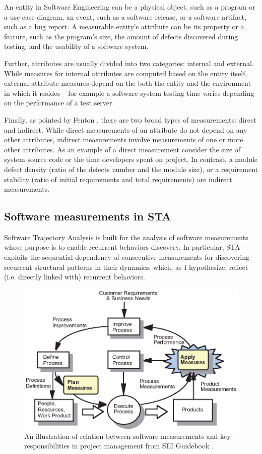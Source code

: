 An entity in Software Engineering can be a physical object, such as a program or a use case diagram, 
an event, such as a software release, or a software artifact, such as a bug report.
A measurable entity's attribute can be its property or a feature, such as the program's size, the 
amount of defects discovered during testing, and the usability of a software system.

Further, attributes are usually divided into two categories: internal and external. 
While measures for internal attributes are computed based on the entity itself, external attribute 
measures depend on the both the entity and the environment in which it resides -- for example a 
software system testing time varies depending on the performance of a test server.

Finally, as pointed by Fenton \cite{citeulike:1803429}, there are two broad types of measurements: direct
and indirect. While direct measurements of an attribute do not depend on any other attributes, 
indirect measurements involve measurements of one or more other attributes. 
As an example of a direct measurement consider the size of system source code or the time developers spent 
on project. In contrast, a module defect density (ratio of the defects number and the module size), 
or a requirement stability (ratio of initial requirements and total requirements) are indirect measurements.

\subsection{Software measurements in STA}
Software Trajectory Analysis is built for the analysis of software measurements whose purpose is to enable 
recurrent behaviors discovery. In particular, STA exploits the sequential dependency of consecutive 
measurements for discovering recurrent structural patterns in their dynamics, which, as I hypothesize, 
reflect (i.e. directly linked with) recurrent behaviors.

\begin{figure}[t]
   \centering
   \includegraphics[width=115mm]{figures/SEI-measurements.eps}
   \caption{An illustration of relation between software measurements and key responsibilities 
   in project management from SEI Guidebook \cite{citeulike:10567306}.}
   \label{fig:sei-measures}
\end{figure}

